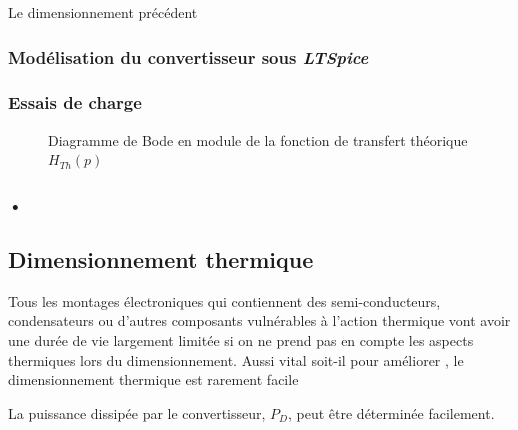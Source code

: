 \documentclass[a4paper,12pt]{report}
\begin{document}
			Le dimensionnement précédent
			
				\subsubsection{Modélisation du convertisseur sous \textit{LTSpice}}
				
				\subsubsection{Essais de charge}
				
				\begin{figure}[h]
\begin{center}
\end{center}
\label{filtre_th}
\caption{Diagramme de Bode en module de la fonction de transfert théorique $H_{Th}(p)$}
\end{figure}
				
				\subsubsection{•}
				
			
			\subsection{Dimensionnement thermique}
			
			Tous les montages électroniques qui contiennent des semi-conducteurs, condensateurs ou d'autres composants vulnérables à l'action thermique vont avoir une durée de vie largement limitée si on ne prend pas en compte les aspects thermiques lors du dimensionnement. Aussi vital soit-il pour améliorer , le dimensionnement thermique est rarement facile 	
			
			La puissance dissipée par le convertisseur, $P_D$, peut être déterminée facilement.
			
\end{document}
